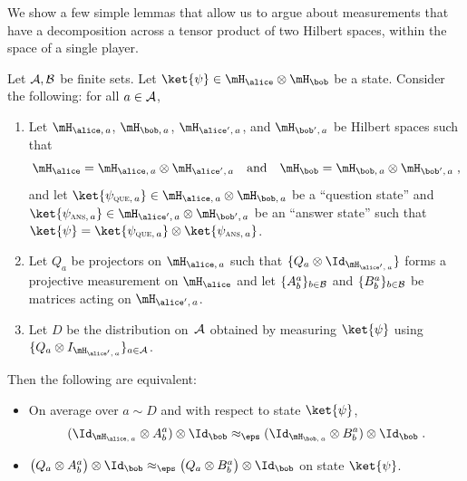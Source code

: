 We show a few simple lemmas that allow us to argue about measurements that
have a decomposition across a tensor product of two Hilbert spaces, within the
space of a single player.

\def\ha{\mH_{\alice}}
\def\hb{\mH_{\bob}}
\def\haq{\mH_{\alice,\, a}}
\def\haa{\mH_{\alice',\, a}}
\def\hbq{\mH_{\bob,\, a}}
\def\hba{\mH_{\bob',\, a}}
\def\sq{\ket{\psi_{\textsc{que},\, a}}}
\def\sa{\ket{\psi_{\textsc{ans},\, a}}}

\begin{lemma}
  \label{lem:conditional}
	Let $\cal{A}, \cal{B}$ be finite sets.
	Let $\ket{\psi} \in \ha \otimes \hb$ be a state.
  Consider the following: for all $a \in \cal{A}$,
  \begin{enumerate}
  \item Let $\haq$, $\hbq$, $\haa$, and $\hba$ be Hilbert spaces such that
    \begin{equation*}
  		\ha = \haq \otimes \haa\quad
      \text{and}\quad
      \hb = \hbq \otimes \hba\;,
		\end{equation*}
    and let $\sq \in \haq \otimes \hbq$ be a ``question state'' and $\sa \in
    \haa \otimes \hba$ be an ``answer state'' such that $\ket{\psi} = \sq
    \otimes \sa$.
  \item Let $Q_a$ be projectors on $\haq$ such that $\{Q_a \otimes
    \Id_{\haa}\}$ forms a projective measurement on $\ha$ and let
    $\{A^{a}_b\}_{b \in \cal{B}}$ and $\{B^{a}_b\}_{b \in \cal{B}}$ be matrices
    acting on $\haa$.
  \item Let $D$ be the distribution on~$\cal{A}$ obtained by measuring
    $\ket{\psi}$ using $\{ Q_a \otimes I_{\haa}\}_{a \in \cal{A}}$.
  \end{enumerate}
  Then the following are equivalent:
	\begin{itemize}
	\item On average over $a\sim D$ and with respect to state $\ket{\psi}$,
    \begin{equation*}
      (\Id_{\haq} \otimes A^{a}_b) \otimes \Id_\bob \approx_\eps
      (\Id_{\hbq} \otimes B^{a}_b) \otimes \Id_\bob\;.
    \end{equation*}
  \item $\bigl( Q_a \otimes A^{a}_b \bigr) \otimes \Id_{\bob} \approx_\eps
    \bigl( Q_a \otimes B^{a}_b \bigr) \otimes \Id_{\bob}$ on state $\ket{\psi}$.
	\end{itemize}
\end{lemma}

